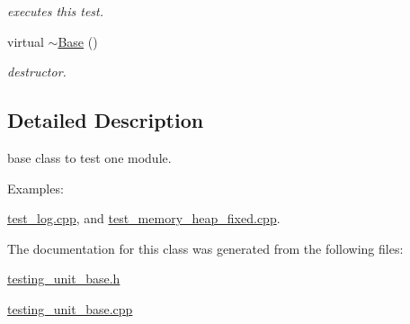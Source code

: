 \begin{DoxyCompactItemize}
\begin{DoxyCompactList}\small\item\em executes this test. \end{DoxyCompactList}\item 
\hypertarget{classhryky_1_1testing_1_1unit_1_1_base_a722da881b6c70cfcbde9243abcfbf334}{virtual \hyperlink{classhryky_1_1testing_1_1unit_1_1_base_a722da881b6c70cfcbde9243abcfbf334}{$\sim$\-Base} ()}\label{classhryky_1_1testing_1_1unit_1_1_base_a722da881b6c70cfcbde9243abcfbf334}

\begin{DoxyCompactList}\small\item\em destructor. \end{DoxyCompactList}\end{DoxyCompactItemize}


\subsection{Detailed Description}
base class to test one module. \begin{Desc}
\item[Examples\-: ]\par
\hyperlink{test_log_8cpp-example}{test\-\_\-log.\-cpp}, and \hyperlink{test_memory_heap_fixed_8cpp-example}{test\-\_\-memory\-\_\-heap\-\_\-fixed.\-cpp}.\end{Desc}


The documentation for this class was generated from the following files\-:\begin{DoxyCompactItemize}
\item 
\hyperlink{testing__unit__base_8h}{testing\-\_\-unit\-\_\-base.\-h}\item 
\hyperlink{testing__unit__base_8cpp}{testing\-\_\-unit\-\_\-base.\-cpp}\end{DoxyCompactItemize}
